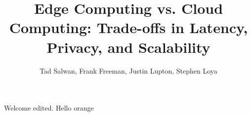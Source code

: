 \documentclass[10pt,a4paper]{article}
\title{Edge Computing vs. Cloud Computing: Trade-offs in Latency, Privacy, and Scalability}
\author{Tad Salwan, Frank Freeman, Justin Lupton, Stephen Loya}
\begin{document}
	\maketitle
	Welcome edited. Hello orange
\end{document}
